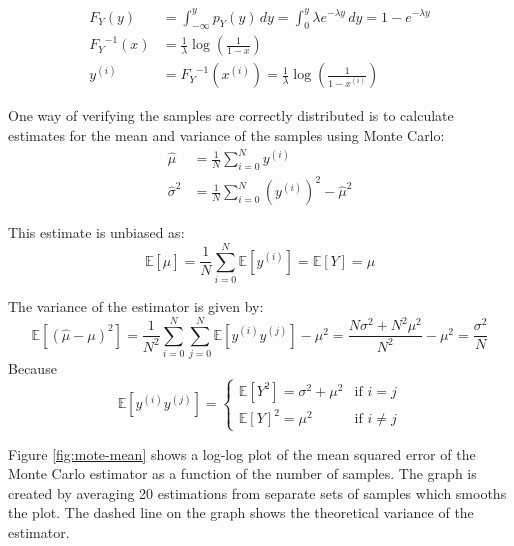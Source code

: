 \documentclass[12pt]{article}
\begin{document}
\begin{align}
  F_Y (y) &= \int _ {- \infty} ^ y p_Y (y) \, dy =  \int _ 0 ^ y \lambda e ^ {- \lambda y} \, dy = 1 - e ^ {- \lambda y} \\
  {F_Y} ^ {-1} (x) &= \frac 1  \lambda \log {\left( \frac 1 {1 - x} \right)} \\
  y^{(i)} &= {F_Y} ^ {-1} (x ^ {(i)}) = \frac 1  \lambda  \log \left(\frac 1 {1 - x ^ {(i)}}  \right)
\end{align}

One way of verifying the samples are correctly distributed is to calculate estimates for the mean and variance of the samples using Monte Carlo:
\begin{align}
	\hat{\mu} &= \frac 1 N \sum ^ N _ {i=0} y^{(i)} \\
    \hat{\sigma}^2 &= \frac 1 N \sum ^ N _ {i=0} (y^{(i)})^2 - \hat \mu^2
\end{align}

This estimate is unbiased as:
\begin{equation}
	\mathbb{E}   [\hat{\mu}] = \frac 1 N \sum ^ N _ {i=0} \mathbb{E} [y^{(i)}] = \mathbb{E} [Y] = \mu
\end{equation}

The variance of the estimator is given by:
\begin{equation}
	\mathbb{E} [(\hat{\mu} - \mu)^2] =
    \frac 1 {N^2} \sum ^ N _ {i=0} \sum ^ N _ {j = 0} \mathbb{E} [y^{(i)}y^{(j)}] - \mu^2 =
   \frac {N\sigma^2 + N^2\mu^2} {N^2} - \mu^2 = 
   \frac {\sigma^2} N
\end{equation}
Because 
\begin{equation*}
  \mathbb{E} [y^{(i)}y^{(j)}]  = 
  \begin{cases} 
      \mathbb{E} [Y^2] = \sigma^2  +\mu^2 & \mbox{if } i = j \\
      \mathbb E [Y]^2 = \mu^2 & \mbox{if } i \ne j  	
  \end{cases}
\end{equation*}

Figure \ref{fig:mote-mean} shows a log-log plot of the mean squared error of the Monte Carlo estimator as a function of the number of samples.
The graph is created by averaging 20 estimations from separate sets of samples which smooths the plot.
The dashed line on the graph shows the theoretical variance of the estimator.
\end{document}

